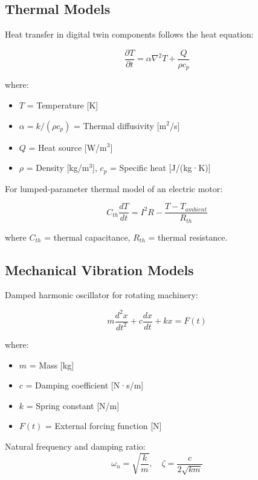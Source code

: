 \documentclass[12pt,a4paper]{article}
\begin{document}
\subsection{Thermal Models}

Heat transfer in digital twin components follows the heat equation:

\begin{equation}
\frac{\partial T}{\partial t} = \alpha \nabla^2 T + \frac{Q}{\rho c_p}
\end{equation}

where:
\begin{itemize}
    \item $T$ = Temperature [K]
    \item $\alpha = k/(\rho c_p)$ = Thermal diffusivity [m$^2$/s]
    \item $Q$ = Heat source [W/m$^3$]
    \item $\rho$ = Density [kg/m$^3$], $c_p$ = Specific heat [J/(kg·K)]
\end{itemize}

For lumped-parameter thermal model of an electric motor:

\begin{equation}
C_{th}\frac{dT}{dt} = I^2R - \frac{T - T_{ambient}}{R_{th}}
\end{equation}

where $C_{th}$ = thermal capacitance, $R_{th}$ = thermal resistance.

\subsection{Mechanical Vibration Models}

Damped harmonic oscillator for rotating machinery:

\begin{equation}
m\frac{d^2x}{dt^2} + c\frac{dx}{dt} + kx = F(t)
\end{equation}

where:
\begin{itemize}
    \item $m$ = Mass [kg]
    \item $c$ = Damping coefficient [N·s/m]
    \item $k$ = Spring constant [N/m]
    \item $F(t)$ = External forcing function [N]
\end{itemize}

Natural frequency and damping ratio:
\begin{equation}
\omega_n = \sqrt{\frac{k}{m}}, \quad \zeta = \frac{c}{2\sqrt{km}}
\end{equation}
\end{document}
